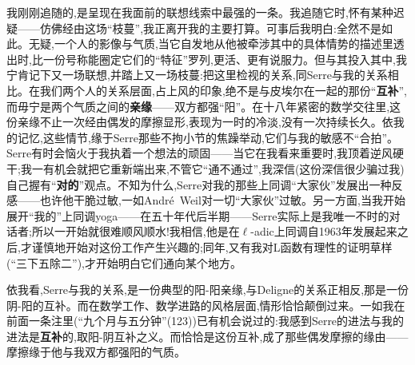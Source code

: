 我刚刚追随的,是呈现在我面前的联想线索中最强的一条。我追随它时,怀有某种迟疑——仿佛经由这场“枝蔓”,我正离开我的主要打算。可事后我明白:全然不是如此。无疑,一个人的影像与气质,当它自发地从他被牵涉其中的具体情势的描述里透出时,比一份号称能圈定它们的“特征”罗列,更活、更有说服力。但与其投入其中,我宁肯记下又一场联想,并踏上又一场枝蔓:把这里检视的关系,同Serre与我的关系相比。在我们两个人的关系层面,占上风的印象,绝不是与皮埃尔在一起的那份“\textbf{互补}”,而毋宁是两个气质之间的\textbf{亲缘}——双方都强“阳”。在十八年紧密的数学交往里,这份亲缘不止一次经由偶发的摩擦显形,表现为一时的冷淡,没有一次持续长久。依我的记忆,这些情节,缘于Serre那些不拘小节的焦躁举动,它们与我的敏感不“合拍”。Serre有时会恼火于我执着一个想法的顽固——当它在我看来重要时,我顶着逆风硬干;我一有机会就把它重新端出来,不管它“通不通过”,我深信(这份深信很少骗过我)自己握有“\textbf{对的}”观点。不知为什么,Serre对我的那些上同调“大家伙”发展出一种反感——也许他干脆过敏,一如André~Weil对一切“大家伙”过敏。另一方面,当我开始展开“我的”上同调yoga——在五十年代后半期——Serre实际上是我唯一不时的对话者;所以一开始就很难顺风顺水!我相信,他是在$\ell$-adic上同调自1963年发展起来之后,才谨慎地开始对这份工作产生兴趣的;同年,又有我对L函数有理性的证明草样(“三下五除二”)\dmark{},才开始明白它们通向某个地方。

依我看,Serre与我的关系,是一份典型的阳-阳亲缘,与Deligne的关系正相反,那是一份阴-阳的互补。而在数学工作、数学进路的风格层面,情形恰恰颠倒过来。一如我在前面一条注里(“九个月与五分钟”(123))已有机会说过的:我感到Serre的进法与我的进法是\textbf{互补}的,取阳-阴互补之义。而恰恰是这份互补,成了那些偶发摩擦的缘由——摩擦缘于他与我双方都强阳的气质。

